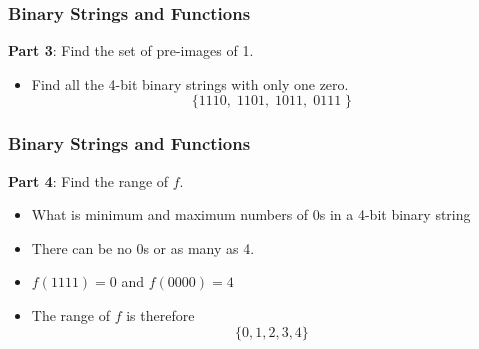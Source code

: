\documentclass{beamer}
\begin{document}
\begin{frame}
\frametitle{Binary Strings and Functions}
\Large
\vspace{-1cm}
\textbf{Part 3}: Find the set of pre-images of 1.

\begin{itemize}
\item Find all the 4-bit binary strings with only one zero.
\LARGE
\[\{1110, \; 1101, \; 1011,\; 0111\; \}\] 

\end{itemize}
\end{frame}
\begin{frame}
\frametitle{Binary Strings and Functions}
\Large
\vspace{-1cm}
\textbf{Part 4}: Find the range of $f$.

\begin{itemize}
\item What is minimum and maximum numbers of 0s in a 4-bit binary string
\item There can be no 0s or as many as 4.
\item $f(1111) = 0$ and $f(0000) = 4$
\item The range of $f$ is therefore
\LARGE 
\[\{0,1,2,3,4\}\] 

\end{itemize}
\end{frame}
\end{document}
